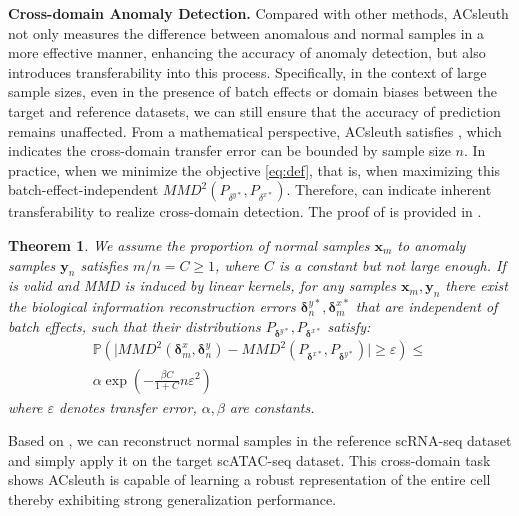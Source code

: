 \documentclass{article}
\newtheorem{theorem}{Theorem}[section]
\begin{document}
\textbf{Cross-domain Anomaly Detection.} 
Compared with other methods, ACsleuth not only measures the difference between anomalous and normal samples in a more effective manner,
enhancing the accuracy of anomaly detection, but also introduces transferability into this process.
Specifically, in the context of large sample sizes, even in the presence of batch effects or domain biases between the target and reference datasets,
we can still ensure that the accuracy of prediction remains unaffected. 
From a mathematical perspective, ACsleuth satisfies , which indicates the cross-domain transfer error can be bounded by sample size $n$.
In practice, when we minimize the objective \eqref{eq:def}, that is, when maximizing this batch-effect-independent $MMD^2\left(P_{\delta^{y*}}, P_{\delta^{x*}}\right)$.
Therefore,  can indicate inherent transferability to realize cross-domain detection.
The proof of  is provided in .
\begin{theorem}\label{th:trans}
We assume the proportion of normal samples $\bm{x}_m$ to anomaly samples $\bm{y}_n$ satisfies $m/n = C \geq 1$, where $C$ is a constant but not large enough.
If  is valid and MMD is induced by linear kernels, for any samples $\bm{x}_m, \bm{y}_n$
there exist the biological information reconstruction errors $\bm{\delta}_n^{y*}, \bm{\delta}_m^{x*}$ that are independent of batch effects, such that their distributions $P_{\bm{\delta}^{y*}}, P_{\bm{\delta}^{x*}}$ satisfy:
\begin{multline}
    \mathbb{P}\left(\big| MMD^2(\bm{\delta}_m^x, \bm{\delta}_n^y) - MMD^2(P_{\bm{\delta}^{x*}}, P_{\bm{\delta}^{y*}}) \big| \geq \varepsilon \right) \leq \\
    \alpha \exp\left(-\frac{\beta C}{1+C}n\varepsilon^2\right)
\end{multline}
where $\varepsilon$ denotes transfer error, $\alpha, \beta$ are constants.
\end{theorem}
Based on , we can reconstruct normal samples in the reference scRNA-seq dataset 
and simply apply it on the target scATAC-seq dataset. 
This cross-domain task shows ACsleuth is capable of learning a robust representation of the entire cell thereby exhibiting strong 
generalization performance.
\end{document}
